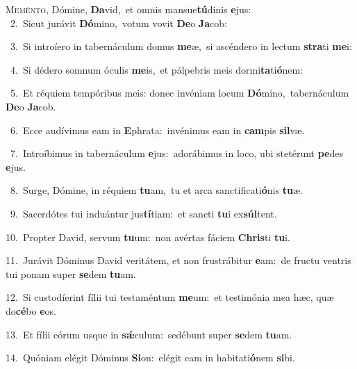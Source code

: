 \lettrine{\initial\textcolor{\initialcolor}{M}}{eménto,} Dómine, \textbf{Da}\-vid,~\star et omnis mansue\-\textbf{tú}\-dinis \textbf{e}\-jus:\\
{\numbfont\textcolor{\numbcolor}{~2.}}~Sicut jurávit \textbf{Dó}\-mino,~\star votum vovit \textbf{De}\-o \textbf{Ja}\-cob:\par
{\numbfont\textcolor{\numbcolor}{~3.}}~Si introíero in tabernáculum domus \textbf{me}\-æ,~\star si ascéndero in lectum \textbf{stra}\-ti \textbf{me}\-i:\par
{\numbfont\textcolor{\numbcolor}{~4.}}~Si dédero somnum óculis \textbf{me}\-is,~\star et pálpebris meis dormi\-\textbf{ta}\-ti\-\textbf{ó}\-nem:\par
{\numbfont\textcolor{\numbcolor}{~5.}}~Et réquiem tempóribus meis: donec invéniam locum \textbf{Dó}\-mino,~\star tabernáculum \textbf{De}\-o \textbf{Ja}\-cob.\par
{\numbfont\textcolor{\numbcolor}{~6.}}~Ecce audívimus eam in \textbf{E}\-phrata:~\star invénimus eam in \textbf{cam}\-pis \textbf{sil}\-væ.\par
{\numbfont\textcolor{\numbcolor}{~7.}}~Introíbimus in tabernáculum \textbf{e}\-jus:~\star adorábimus in loco, ubi stetérunt \textbf{pe}\-des \textbf{e}\-jus.\par
{\numbfont\textcolor{\numbcolor}{~8.}}~Surge, Dómine, in réquiem \textbf{tu}\-am,~\star tu et arca sanctificati\-\textbf{ó}\-nis \textbf{tu}\-æ.\par
{\numbfont\textcolor{\numbcolor}{~9.}}~Sacerdótes tui induántur jus\-\textbf{tí}\-tiam:~\star et sancti \textbf{tu}\-i ex\-\textbf{súl}\-tent.\par
{\numbfont\textcolor{\numbcolor}{10.}}~Propter David, servum \textbf{tu}\-um:~\star non avértas fáciem \textbf{Chris}\-ti \textbf{tu}\-i.\par
{\numbfont\textcolor{\numbcolor}{11.}}~Jurávit Dóminus David veritátem, et non frustrábitur \textbf{e}\-am:~\star de fructu ventris tui ponam super \textbf{se}\-dem \textbf{tu}\-am.\par
{\numbfont\textcolor{\numbcolor}{12.}}~Si custodíerint fílii tui testaméntum \textbf{me}\-um:~\star et testimónia mea hæc, quæ do\-\textbf{cé}\-bo \textbf{e}\-os.\par
{\numbfont\textcolor{\numbcolor}{13.}}~Et fílii eórum usque in \textbf{sǽ}\-culum:~\star sedébunt super \textbf{se}\-dem \textbf{tu}\-am.\par
{\numbfont\textcolor{\numbcolor}{14.}}~Quóniam elégit Dóminus \textbf{Si}\-on:~\star elégit eam in habitati\-\textbf{ó}\-nem \textbf{si}\-bi.\par
